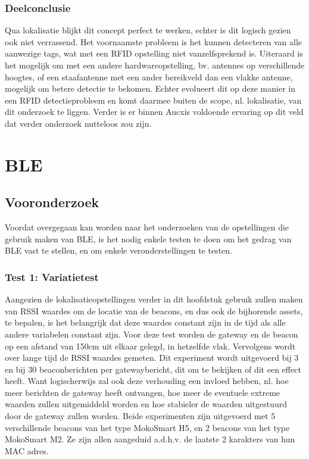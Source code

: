 \subsubsection{Deelconclusie}
Qua lokalisatie blijkt dit concept perfect te werken, echter is dit logisch gezien ook niet verrassend. Het voornaamste probleem is het kunnen detecteren van alle aanwezige tags, wat met een RFID opstelling niet vanzelfsprekend is. Uiteraard is het mogelijk om met een andere hardwareopstelling, bv. antennes op verschillende hoogtes, of een staafantenne met een ander bereikveld dan een vlakke antenne, mogelijk om betere detectie te bekomen. Echter evolueert dit op deze manier in een RFID detectieprobleem en komt daarmee buiten de scope, nl. lokalisatie, van dit onderzoek te liggen. Verder is er binnen Aucxis voldoende ervaring op dit veld dat verder onderzoek nutteloos zou zijn.

\section{BLE}

\subsection{Vooronderzoek}
Voordat overgegaan kan worden naar het onderzoeken van de opstellingen die gebruik maken van BLE, is het nodig enkele testen te doen om het gedrag van BLE vast te stellen, en om enkele veronderstellingen te testen.

\subsubsection{Test 1: Variatietest}
Aangezien de lokalisatieopstellingen verder in dit hoofdstuk gebruik zullen maken van RSSI waardes om de locatie van de beacons, en dus ook de bijhorende assets, te bepalen, is het belangrijk dat deze waardes constant zijn in de tijd als alle andere variabelen constant zijn. 
Voor deze test worden de gateway en de beacon op een afstand van 150cm uit elkaar gelegd, in hetzelfde vlak. Vervolgens wordt over lange tijd de RSSI waardes gemeten. Dit experiment wordt uitgevoerd bij 3 en bij 30 beaconberichten per gatewaybericht, dit om te bekijken of dit een effect heeft. Want logischerwijs zal ook deze verhouding een invloed hebben, nl. hoe meer berichten de gateway heeft ontvangen, hoe meer de eventuele extreme waarden zullen uitgemiddeld worden en hoe stabieler de waarden uitgestuurd door de gateway zullen worden.
Beide experimenten zijn uitgevoerd met 5 verschillende beacons van het type MokoSmart H5, en 2 beacons van het type MokoSmart M2. Ze zijn allen aangeduid a.d.h.v. de laatste 2 karakters van hun MAC adres.

